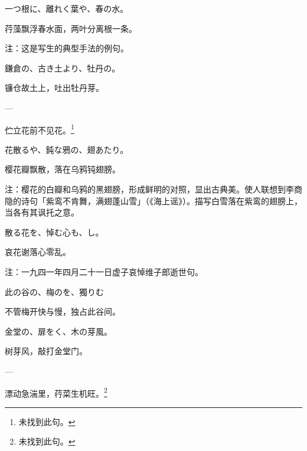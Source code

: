 \begin{haiku}
    {\FH 一つ根に、離れく葉や、春の水。}

    {\FK 荇藻飘浮春水面，两叶分离根一条。}

    {\FT 注：这是写生的典型手法的例句。}
\end{haiku}

\begin{haiku}
    {\FH 鎌倉の、古き土より、牡丹の。}

    {\FK 镰仓故土上，吐出牡丹芽。}
\end{haiku}

\begin{haiku}
    {\FH ---}

    {\FK 伫立花前不见花。\footnote{\FT 未找到此句。}}
\end{haiku}

\begin{haiku}
    {\FH 花散るや、鈍な鴉の、翅あたり。}

    {\FK 樱花瓣飘散，落在乌鸦钝翅膀。}

    {\FT 注：樱花的白瓣和乌鸦的黑翅膀，形成鲜明的对照，显出古典美。使人联想到李商隐的诗句「紫鸾不肯舞，满翅蓬山雪」（《海上谣》）。描写白雪落在紫鸾的翅膀上，当各有其讽托之意。}
\end{haiku}

\begin{haiku}
    {\FH 散る花を、悼む心も、し。}

    {\FK 哀花谢落心零乱。}

    {\FT 注：一九四一年四月二十一日虚子哀悼维子郎逝世句。}
\end{haiku}

\begin{haiku}
    {\FH 此の谷の、梅のを、獨りむ}

    {\FK 不管梅开快与慢，独占此谷间。}
\end{haiku}

\begin{haiku}
    {\FH 金堂の、扉をく、木の芽風。}

    {\FK 树芽风，敲打金堂门。}
\end{haiku}

\begin{haiku}
    {\FH ---}

    {\FK 漂动急湍里，荇菜生机旺。\footnote{\FT 未找到此句。}}
\end{haiku}

